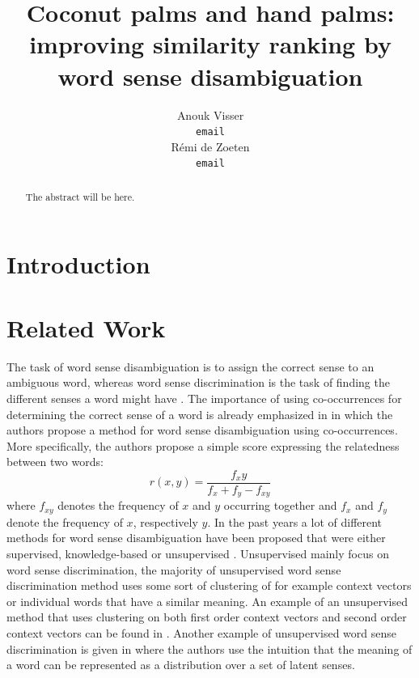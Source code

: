 \documentclass[11pt]{article}
\title{Coconut palms and hand palms: improving similarity ranking by word sense disambiguation}
\author{Anouk Visser \\
  {\tt email} \\\And
  R\'emi de Zoeten \\
  {\tt email} \\}
\date{}
\begin{document}
\maketitle
\begin{abstract}
The abstract will be here.
\end{abstract}

\section{Introduction}

\section{Related Work}
The task of word sense disambiguation is to assign the correct sense to an ambiguous word, whereas word sense discrimination is the task of finding the different senses a word might have \cite{old}. The importance of using co-occurrences for determining the correct sense of a word is already emphasized in \cite{relatedness} in which the authors propose a method for word sense disambiguation using co-occurrences. More specifically, the authors propose a simple score expressing the relatedness between two words:
\begin{equation}\label{r}r(x, y) = \frac{f_xy}{f_x+f_y - f_{xy}}\end{equation}
where $f_{xy}$ denotes the frequency of $x$ and $y$ occurring together and $f_x$ and $f_y$ denote the frequency of $x$, respectively $y$. 
In the past years a lot of different methods for word sense disambiguation have been proposed that were either supervised, knowledge-based or unsupervised \cite{survey}. Unsupervised mainly focus on word sense discrimination, the majority of unsupervised word sense discrimination method uses some sort of clustering of for example context vectors or individual words that have a similar meaning. An example of an unsupervised method that uses clustering on both first order context vectors and second order context vectors can be found in \cite{clustering}. Another example of unsupervised word sense discrimination is given in \cite{latent} where the authors use the intuition that the meaning of a word can be represented as a distribution over a set of latent senses.
\end{document}
